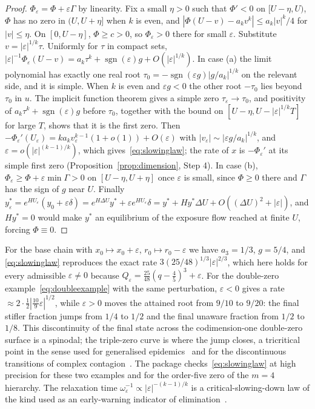 \documentclass[11pt,a4paper]{article}
\theoremstyle{definition}\newtheorem{definition}[theorem]{Definition}
\theoremstyle{remark}\newtheorem{remark}[theorem]{Remark}
\begin{document}
\begin{proof}
$\Phi_\varepsilon=\Phi+\varepsilon\Gamma$ by linearity. Fix a small
$\eta>0$ such that $\Phi'<0$ on $[U-\eta,U)$, $\Phi$ has no zero in
$(U,U+\eta]$ when $k$ is even, and $|\Phi(U-v)-a_kv^k|\le a_k|v|^k/4$
for $|v|\le\eta$. On $[0,U-\eta]$, $\Phi\ge c>0$, so
$\Phi_\varepsilon>0$ there for small $\varepsilon$. Substitute
$v=|\varepsilon|^{1/k}\tau$. Uniformly for $\tau$ in compact sets,
$|\varepsilon|^{-1}\Phi_\varepsilon(U-v)=a_k\tau^k+\operatorname{sgn}(\varepsilon)g+O(|\varepsilon|^{1/k})$.
In case (a) the limit polynomial has exactly one real root
$\tau_0=-\operatorname{sgn}(\varepsilon g)|g/a_k|^{1/k}$ on the relevant
side, and it is simple. When $k$ is even and $\varepsilon g<0$ the
other root $-\tau_0$ lies beyond $\tau_0$ in $u$. The implicit function
theorem gives a simple zero $\tau_\varepsilon\to\tau_0$, and positivity
of $a_k\tau^k+\operatorname{sgn}(\varepsilon)g$ before $\tau_0$, together with the
bound on $[U-\eta,U-|\varepsilon|^{1/k}T]$ for large $T$, shows that it
is the first zero. Then
$-\Phi_\varepsilon'(U_\varepsilon)=ka_kv_\varepsilon^{k-1}(1+o(1))+O(\varepsilon)$
with $|v_\varepsilon|\sim|\varepsilon g/a_k|^{1/k}$, and
$\varepsilon=o(|\varepsilon|^{(k-1)/k})$, which
gives~\eqref{eq:slowinglaw}; the rate of $x$ is $-\Phi_\varepsilon'$ at
its simple first zero (Proposition~\ref{prop:dimension}, Step 4). In
case (b), $\Phi_\varepsilon\ge\Phi+\varepsilon\min\Gamma>0$ on
$[U-\eta,U+\eta]$ once $\varepsilon$ is small, since $\Phi\ge0$ there
and $\Gamma$ has the sign of $g$ near $U$. Finally
$y^*_\varepsilon=e^{HU_\varepsilon}(y_0+\varepsilon\delta)
=e^{H\Delta U}y^*+\varepsilon e^{HU_\varepsilon}\delta
=y^*+Hy^*\Delta U+O((\Delta U)^2+|\varepsilon|)$, and $Hy^*=0$
would make $y^*$ an equilibrium of the exposure flow reached at finite
$U$, forcing $\Phi\equiv0$.
\end{proof}

For the base chain with $x_0\mapsto x_0+\varepsilon$,
$r_0\mapsto r_0-\varepsilon$ we have $a_3=1/3$, $g=5/4$, and
\eqref{eq:slowinglaw} reproduces the exact rate
$3(25/48)^{1/3}|\varepsilon|^{2/3}$, which here holds for every
admissible $\varepsilon\ne0$ because $Q_\varepsilon=\frac{25}{48}(q-\frac45)^3+\varepsilon$.
For the double-zero example~\eqref{eq:doubleexample} with the same
perturbation, $\varepsilon<0$ gives a rate
$\approx2\cdot\frac12|\tfrac{10}9\varepsilon|^{1/2}$, while $\varepsilon>0$
moves the attained root from $9/10$ to $9/20$: the final stifler
fraction jumps from $1/4$ to $1/2$ and the final unaware fraction from
$1/2$ to $1/8$. This discontinuity of the final state across the
codimension-one double-zero surface is a spinodal; the triple-zero curve
is where the jump closes, a tricritical point in the sense used for
generalised epidemics~\cite{Janssen,Bizhani,ChoiLeeKahng} and for the
discontinuous transitions of complex contagion~\cite{DoddsWatts,ChenCoinfection}.
The package checks~\eqref{eq:slowinglaw} at high precision for these
two examples and for the order-five zero of the $m=4$ hierarchy.
The relaxation time $\omega_\varepsilon^{-1}\propto|\varepsilon|^{-(k-1)/k}$
is a critical-slowing-down law of the kind used as an early-warning
indicator of elimination~\cite{ORegan}.
\end{document}

